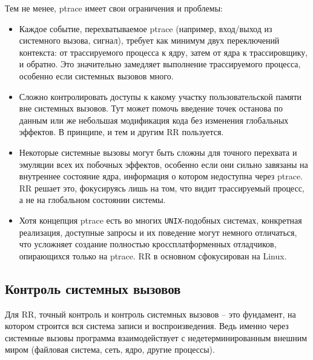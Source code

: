 Тем не менее, ptrace имеет свои ограничения и проблемы:

\begin{itemize}

  \item Каждое событие, перехватываемое ptrace (например, вход/выход из
  системного вызова, сигнал), требует как минимум двух переключений контекста:
  от трассируемого процесса к ядру, затем от ядра к трассировщику, и обратно.
  Это значительно замедляет выполнение трассируемого процесса, особенно если
  системных вызовов много.

  \item Сложно контролировать доступы к какому участку пользовательской памяти
  вне системных вызовов. Тут может помочь введение точек останова по данным или
  же небольшая модификация кода без изменения глобальных эффектов. В принципе,
  и тем и другим RR пользуется.

  \item Некоторые системные вызовы могут быть сложны для точного перехвата и
  эмуляции всех их побочных эффектов, особенно если они сильно завязаны на
  внутреннее состояние ядра, информация о котором недоступна через ptrace. RR
  решает это, фокусируясь лишь на том, что видит трассируемый процесс, а не на
  глобальном состоянии системы.

  \item Хотя концепция ptrace есть во многих \texttt{UNIX}-подобных системах, конкретная
  реализация, доступные запросы и их поведение могут немного отличаться, что
  усложняет создание полностью кроссплатформенных отладчиков, опирающихся
  только на ptrace. RR в основном сфокусирован на Linux.

\end{itemize}

\subsection{Контроль системных вызовов}


Для RR, точный контроль и контроль системных вызовов – это фундамент,
на котором строится вся система записи и воспроизведения. Ведь именно через
системные вызовы программа взаимодействует с недетерминированным внешним миром
(файловая система, сеть, ядро, другие процессы).

